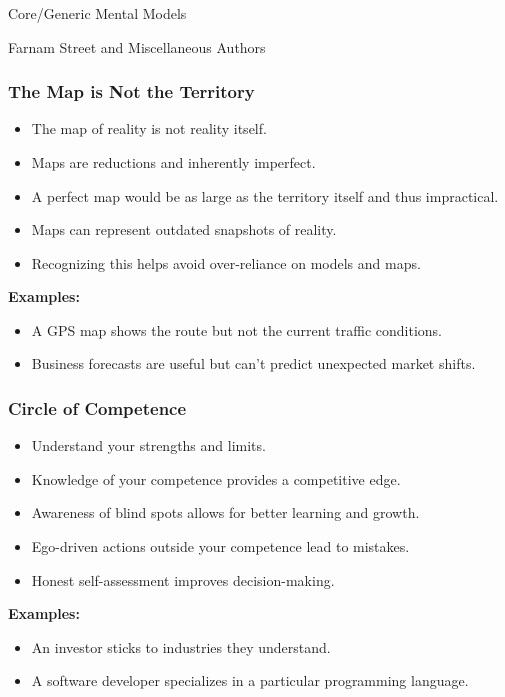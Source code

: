 \begin{frame}[fragile]\frametitle{}
\begin{center}
{\Large Core/Generic Mental Models}

{\tiny Farnam Street and Miscellaneous Authors }


\end{center}
\end{frame}

\begin{frame}[fragile]\frametitle{The Map is Not the Territory}
\begin{itemize}
    \item The map of reality is not reality itself.
    \item Maps are reductions and inherently imperfect.
    \item A perfect map would be as large as the territory itself and thus impractical.
    \item Maps can represent outdated snapshots of reality.
    \item Recognizing this helps avoid over-reliance on models and maps.
\end{itemize}
\textbf{Examples:}
\begin{itemize}
    \item A GPS map shows the route but not the current traffic conditions.
    \item Business forecasts are useful but can’t predict unexpected market shifts.
\end{itemize}
\end{frame}

\begin{frame}[fragile]\frametitle{Circle of Competence}
\begin{itemize}
    \item Understand your strengths and limits.
    \item Knowledge of your competence provides a competitive edge.
    \item Awareness of blind spots allows for better learning and growth.
    \item Ego-driven actions outside your competence lead to mistakes.
    \item Honest self-assessment improves decision-making.
\end{itemize}
\textbf{Examples:}
\begin{itemize}
    \item An investor sticks to industries they understand.
    \item A software developer specializes in a particular programming language.
\end{itemize}
\end{frame}

